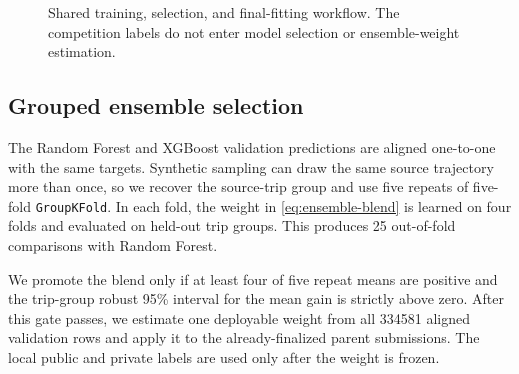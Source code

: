 \begin{figure}[H]
  \centering
  \caption[Shared training, selection, and final-fitting workflow]{Shared training, selection, and final-fitting workflow.  The competition labels do not enter model selection or ensemble-weight estimation.}
\end{figure}

\subsection{Grouped ensemble selection}

The Random Forest and XGBoost validation predictions are aligned one-to-one with the same targets.  Synthetic sampling can draw the same source trajectory more than once, so we recover the source-trip group and use five repeats of five-fold \texttt{GroupKFold}.  In each fold, the weight in \cref{eq:ensemble-blend} is learned on four folds and evaluated on held-out trip groups.  This produces 25 out-of-fold comparisons with Random Forest.

We promote the blend only if at least four of five repeat means are positive and the trip-group robust 95\% interval for the mean gain is strictly above zero.  After this gate passes, we estimate one deployable weight from all \num{334581} aligned validation rows and apply it to the already-finalized parent submissions.  The local public and private labels are used only after the weight is frozen.

